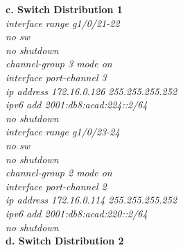 \documentclass[12pt,a4paper]{report}
\begin{document}
\hspace*{1cm}\textbf{c. Switch Distribution 1}\\
\hspace*{2cm}\textit{interface range g1/0/21-22\\
\hspace*{2cm}no sw\\
\hspace*{2cm}no shutdown\\
\hspace*{2cm}channel-group 3 mode on \\
\hspace*{2cm}interface port-channel 3\\
\hspace*{2cm}ip address 172.16.0.126 255.255.255.252\\
\hspace*{2cm}ipv6 add 2001:db8:acad:224::2/64\\
\hspace*{2cm}no shutdown\\
\hspace*{2cm}interface range g1/0/23-24\\
\hspace*{2cm}no sw\\
\hspace*{2cm}no shutdown\\
\hspace*{2cm}channel-group 2 mode on \\
\hspace*{2cm}interface port-channel 2\\
\hspace*{2cm}ip address 172.16.0.114 255.255.255.252\\
\hspace*{2cm}ipv6 add 2001:db8:acad:220::2/64\\
\hspace*{2cm}no shutdown\\}
\hspace*{1cm}\textbf{d. Switch Distribution 2}\\
\end{document}
